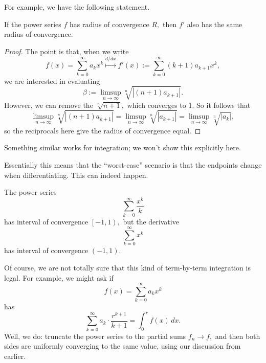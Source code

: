 \documentclass[../notes.tex]{subfiles}
\begin{document}
For example, we have the following statement.
\begin{proposition}
	If the power series $f$ has radius of convergence $R,$ then $f'$ also has the same radius of convergence.
\end{proposition}
\begin{proof}
	The point is that, when we write
	\[f(x)=\sum_{k=0}^\infty a_kx^k\stackrel{d/dx}\longmapsto f'(x):=\sum_{k=0}^\infty(k+1)a_{k+1}x^k,\]
	we are interested in evaluating
	\[\beta:=\limsup_{n\to\infty}\sqrt[n]{|(n+1)a_{k+1}|}.\]
	However, we can remove the $\sqrt[n]{n+1},$ which converges to $1.$ So it follows that
	\[\limsup_{n\to\infty}\sqrt[n]{|(n+1)a_{k+1}|}=\limsup_{n\to\infty}\sqrt[n]{|a_{k+1}|}=\limsup_{n\to\infty}\sqrt[n]{|a_{k}|},\]
	so the reciprocals here give the radius of convergence equal.
\end{proof}
\begin{remark}
	Something similar works for integration; we won't show this explicitly here.
\end{remark}
Essentially this means that the ``worst-case'' scenario is that the endpoints change when differentiating. This can indeed happen.
\begin{example}
	The power series
	\[\sum_{k=0}^\infty\frac{x^k}k\]
	has interval of convergence $\left[-1,1\right),$ but the derivative
	\[\sum_{k=0}^\infty x^k\]
	has interval of convergence $(-1,1).$
\end{example}
Of course, we are not totally sure that this kind of term-by-term integration is legal. For example, we might ask if
\[f(x)=\sum_{k=0}^\infty a_kx^k\]
has
\[\sum_{k=0}^\infty a_k\cdot\frac{r^{k+1}}{k+1}=\int_0^rf(x)\,dx.\]
Well, we do: truncate the power series to the partial sums $f_n\to f,$ and then both sides are uniformly converging to the same value, using our discussion from earlier.
\end{document}
